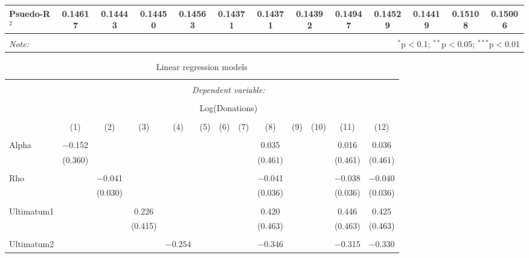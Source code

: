 \begin{table}[H]
\begin{adjustbox}{width=\textwidth}
\begin{tabular}{@{\extracolsep{5pt}}lcccccccccccc}
  Psuedo-R$^{2}$ & 0.14617 & 0.14443 &0.14450 & 0.14563 & 0.14371 &0.14371 & 0.14392 & 0.14947 & 0.14529 & 0.14419 & 0.15108 & 0.15006 \\
  \hline 
\hline \\[-1.8ex] 
\textit{Note:}  & \multicolumn{12}{r}{$^{*}$p$<$0.1; $^{**}$p$<$0.05; $^{***}$p$<$0.01} \\ 
\end{tabular} 
\end{adjustbox}
\end{table} 
  
  
  
 

\newpage

\begin{table}[H] \centering 
  \caption{Linear regression models} 
  \label{} 
   \begin{adjustbox}{width=\textwidth}
   \begin{tabular}{@{\extracolsep{5pt}}lcccccccccccc} 
\\[-1.8ex]\hline 
\hline \\[-1.8ex] 
 & \multicolumn{12}{c}{\textit{Dependent variable:}} \\ 
\cline{2-13} 
\\[-1.8ex] & \multicolumn{12}{c}{Log(Donations)} \\ 
\\[-1.8ex] & (1) & (2) & (3) & (4) & (5) & (6) & (7) & (8) & (9) & (10) & (11) & (12)\\ 
\hline \\[-1.8ex] 
 Alpha & $-$0.152 &  &  &  &  &  &  & 0.035 &  &  & 0.016 & 0.036 \\ 
  & (0.360) &  &  &  &  &  &  & (0.461) &  &  & (0.461) & (0.461) \\ 
  & & & & & & & & & & & & \\ 
 Rho &  & $-$0.041 &  &  &  &  &  & $-$0.041 &  &  & $-$0.038 & $-$0.040 \\ 
  &  & (0.030) &  &  &  &  &  & (0.036) &  &  & (0.036) & (0.036) \\ 
  & & & & & & & & & & & & \\ 
 Ultimatum1 &  &  & 0.226 &  &  &  &  & 0.420 &  &  & 0.446 & 0.425 \\ 
  &  &  & (0.415) &  &  &  &  & (0.463) &  &  & (0.463) & (0.463) \\ 
  & & & & & & & & & & & & \\ 
 Ultimatum2 &  &  &  & $-$0.254 &  &  &  & $-$0.346 &  &  & $-$0.315 & $-$0.330 \\ 

\end{tabular}
\end{adjustbox}
\end{table}
